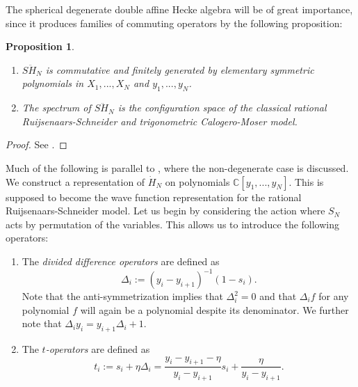 \documentclass[11pt]{report}
\newtheorem{prop}[theorem]{Proposition}
\theoremstyle{definition}
\theoremstyle{remark}
\theoremstyle{remark}
\newcommand{\C}{\mathbb{C}}
\begin{document}
The spherical degenerate double affine Hecke algebra will be of great importance, since it produces families of commuting operators by the following proposition: 

\begin{prop}
\begin{enumerate}[label=(\roman*)]
\item $S\ddot H_N$ is commutative and finitely generated by elementary symmetric polynomials in $X_1,...,X_N$ and $y_1,...,y_N$.
\item The spectrum of $S\ddot H_N$ is the configuration space of the classical rational Ruijsenaars-Schneider and trigonometric Calogero-Moser model.
\end{enumerate}
\end{prop}

\begin{proof}
See \cite{article:oblomkov:2003}.
\end{proof}

Much of the following is parallel to \cite{article:lamers:2022}, where the non-degenerate case is discussed. We construct a representation of $\dot H_N$ on polynomials $\C[y_1,...,y_N]$. This is supposed to become the wave function representation for the rational Ruijsenaars-Schneider model. Let us begin by considering the action where $S_N$ acts by permutation of the variables. This allows us to introduce the following operators:
\begin{enumerate}[label=(\roman*)]
\item The \emph{divided difference operators} are defined as
\begin{equation*}
\Delta_i := (y_i-y_{i+1})^{-1} (1-s_i).
\end{equation*}
Note that the anti-symmetrization implies that $\Delta_i^2 = 0$ and that $\Delta_i f$ for any polynomial $f$ will again be a polynomial despite its denominator. We further note that $\Delta_i y_i = y_{i+1} \Delta_i + 1$.
\item The \emph{$t$-operators} are defined as
\begin{equation*}
t_i := s_i + \eta \Delta_i = \frac{y_i-y_{i+1}-\eta}{y_i-y_{i+1}} s_i + \frac{\eta}{y_i-y_{i+1}}.
\end{equation*}
\end{enumerate}
\end{document}
